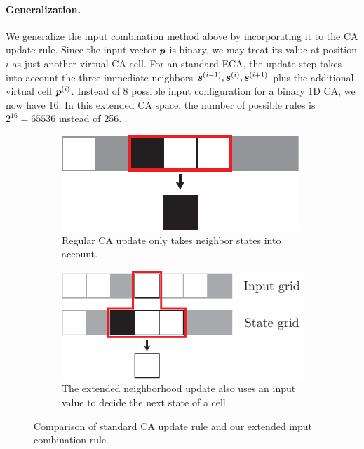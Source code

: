 \paragraph{Generalization.} We generalize the input combination method above by
incorporating it to the \ac{CA} update rule. Since the input vector ${\bm{p}}$ is
binary, we may treat its value at position $i$ as just another virtual \ac{CA}
cell. For an standard \ac{ECA}, the update step takes into account the three
immediate neighbors ${\bm{s}}^{(i - 1)}, {\bm{s}}^{(i)}, {\bm{s}}^{(i + 1)}$ plus the
additional virtual cell ${\bm{p}}^{(i)}$. Instead of 8 possible input configuration
for a binary 1D \ac{CA}, we now have 16. In this extended \ac{CA} space, the
number of possible rules is $2^{16} = 65536$ instead of 256.

\begin{figure}[htbp]
  \centering
    \begin{subfigure}[b]{.387\linewidth}
    \centering
    \includegraphics[width=\linewidth]{figures/ca_update_rule.pdf}
    \caption{Regular CA update only takes neighbor states into
      account.}\label{fig:standard-ca-update}
  \end{subfigure}
  \hspace{10pt}
  \begin{subfigure}[b]{.55\linewidth}
    \centering
    \includegraphics[width=\linewidth]{figures/generalized_ca_update_rule.pdf}
    \caption{The extended neighborhood update also uses an input value to
      decide the next state of a cell.}\label{fig:generalized-ca-update}
  \end{subfigure}
  \caption{Comparison of standard CA update rule and our extended input
    combination rule.\label{fig:ca_update_rule}}
\end{figure}

